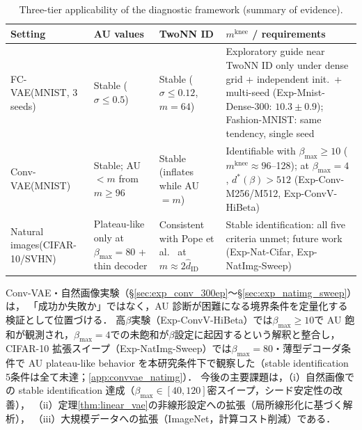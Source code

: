 \documentclass[11pt,a4paper]{jsarticle}
\newcommand{\mknee}{m^{\mathrm{knee}}}
\begin{document}
\begin{table}[H]
\centering
\caption{Three-tier applicability of the diagnostic framework (summary of evidence).}
\label{tab:applicability}
\small
\begin{tabular}{p{2.7cm}p{3.1cm}p{3.3cm}p{5.1cm}}
\toprule
Setting & AU values & TwoNN ID & $\mknee$ / requirements \\
\midrule
FC-VAE\newline (MNIST, 3 seeds) & Stable ($\sigma \leq 0.5$) & Stable ($\sigma \leq 0.12$, $m=64$) &
Exploratory guide near TwoNN ID only under dense grid + independent init.\ + multi-seed
(Exp-Mnist-Dense-300: $10.3 \pm 0.9$); Fashion-MNIST: same tendency, single seed \\
\addlinespace
Conv-VAE\newline (MNIST) & Stable; AU$<m$ from $m \geq 96$ & Stable (inflates while AU$=m$) &
Identifiable with $\beta_{\max} \geq 10$ ($\mknee \approx 96$--128); at $\beta_{\max}=4$, $d^*(\beta) > 512$
(Exp-Conv-M256/M512, Exp-ConvV-HiBeta) \\
\addlinespace
Natural images\newline (CIFAR-10/SVHN) & Plateau-like only at $\beta_{\max}=80$ + thin decoder & Consistent with Pope et al.\ \cite{pope2021intrinsic} at $m \approx 2\hat{d}_\mathrm{ID}$ &
Stable identification: all five criteria unmet; future work
(Exp-Nat-Cifar, Exp-NatImg-Sweep) \\
\bottomrule
\end{tabular}
\end{table}

Conv-VAE・自然画像実験（§\ref{sec:exp_conv_300ep}〜§\ref{sec:exp_natimg_sweep}）は，
「成功か失敗か」ではなく，AU 診断が困難になる境界条件を定量化する検証として位置づける．
高$\beta$実験（Exp-ConvV-HiBeta）では$\beta_{\max} \geq 10$で AU 飽和が観測され，$\beta_{\max}=4$での未飽和が$\beta$設定に起因するという解釈と整合し，
CIFAR-10 拡張スイープ（Exp-NatImg-Sweep）では$\beta_{\max}=80$・薄型デコーダ条件で
AU plateau-like behavior を本研究条件下で観察した（stable identification 5条件は全て未達；\ref{app:convvae_natimg}）．
今後の主要課題は，（i）自然画像での stable identification 達成（$\beta_{\max} \in [40,120]$密スイープ，シード安定性の改善），
（ii）定理\ref{thm:linear_vae}の非線形設定への拡張（局所線形化に基づく解析），
（iii）大規模データへの拡張（ImageNet，計算コスト削減）である．
\end{document}
